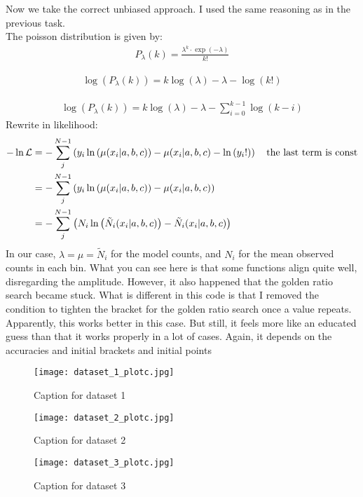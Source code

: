 Now we take the correct unbiased approach. I used the same reasoning as in the previous task.\\
The poisson distribution is given by:
\begin{align}
    P_\lambda (k) = \frac{\lambda^k \cdot \exp(-\lambda)}{k!}
\end{align}

\begin{align}
    \log(P_\lambda (k)) = k \log(\lambda) -\lambda -\log(k!)
\end{align}

\begin{align}
    \log(P_\lambda (k)) = k \log(\lambda) -\lambda - \sum_{i=0}^{k-1} \log(k-i)
\end{align}
Rewrite in likelihood:
\begin{align}
    - \ln \mathcal{L} &= - \sum_j^{N-1} \left({y_i \ln \left({\mu(x_i|a,b,c)}\right)-\mu(x_i|a,b,c)- \ln \left({y_i!}\right)}\right) \quad \text{the last term is const}\\
    &= - \sum_j^{N-1} \left({y_i \ln \left({\mu(x_i|a,b,c)}\right)-\mu(x_i|a,b,c)}\right)\\
    &= - \sum_j^{N-1} \left({N_i \ln \left({\Tilde{N}_i(x_i|a,b,c)}\right)-\Tilde{N}_i(x_i|a,b,c)}\right)
\end{align}
In our case, $\lambda = \mu = \widetilde{N}_i$ for the model counts, and $N_i$ for the mean observed counts in each bin.
What you can see here is that some functions align quite well, disregarding the amplitude. However, it also happened that the golden ratio search became stuck. What is different in this code is that I removed the condition to tighten the bracket for the golden ratio search once a value repeats. Apparently, this works better in this case. But still, it feels more like an educated guess than that it works properly in a lot of cases. Again, it depends on the accuracies and initial brackets and initial points

\begin{figure}[h!]
    \centering
    \texttt{[image: dataset\_1\_plotc.jpg]}
    \caption{Caption for dataset 1}
\end{figure}

\begin{figure}[h!]
    \centering
    \texttt{[image: dataset\_2\_plotc.jpg]}
    \caption{Caption for dataset 2}
\end{figure}

\begin{figure}[h!]
    \centering
    \texttt{[image: dataset\_3\_plotc.jpg]}
    \caption{Caption for dataset 3}
\end{figure}

